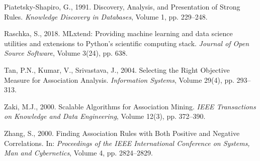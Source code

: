 \documentclass[11pt,a4paper]{article}
\begin{document}
\begin{description}
    \item Piatetsky-Shapiro, G., 1991. Discovery, Analysis, and Presentation of Strong Rules. \textit{Knowledge Discovery in Databases}, Volume 1, pp. 229--248.
    \item Raschka, S., 2018. MLxtend: Providing machine learning and data science utilities and extensions to Python's scientific computing stack. \textit{Journal of Open Source Software}, Volume 3(24), pp. 638.
    \item Tan, P.N., Kumar, V., Srivastava, J., 2004. Selecting the Right Objective Measure for Association Analysis. \textit{Information Systems}, Volume 29(4), pp. 293--313.
    \item Zaki, M.J., 2000. Scalable Algorithms for Association Mining. \textit{IEEE Transactions on Knowledge and Data Engineering}, Volume 12(3), pp. 372--390.
    \item Zhang, S., 2000. Finding Association Rules with Both Positive and Negative Correlations. In: \textit{Proceedings of the IEEE International Conference on Systems, Man and Cybernetics}, Volume 4, pp. 2824--2829.
\end{description}
\end{document}

